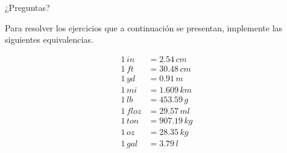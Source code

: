 \begin{frame}
    \begin{center}
        \Huge ¿Preguntas?
    \end{center}
\end{frame}

\begin{frame}
    Para resolver los ejercicios que a continuación se presentan, implemente las siguientes equivalencias.

    \begin{align}
        \num{1}\,\unit{in} &= \num{2.54}\,\unit{cm}\\
        \num{1}\,\unit{ft} &= \num{30.48}\,\unit{cm}\\
        \num{1}\,\unit{yd} &= \num{0.91}\,\unit{m}\\
        \num{1}\,\unit{mi} &= \num{1.609}\,\unit{km}\\
        \num{1}\,\unit{lb} &= \num{453.59}\,\unit{g}\\
        \num{1}\,\unit{fl oz} &= \num{29.57}\,\unit{ml}\\
        \num{1}\,\unit{ton} &= \num{907.19}\,\unit{kg}\\
        \num{1}\,\unit{oz} &= \num{28.35}\,\unit{kg}\\
        \num{1}\,\unit{gal} &= \num{3.79}\,\unit{l}
    \end{align}
\end{frame}

